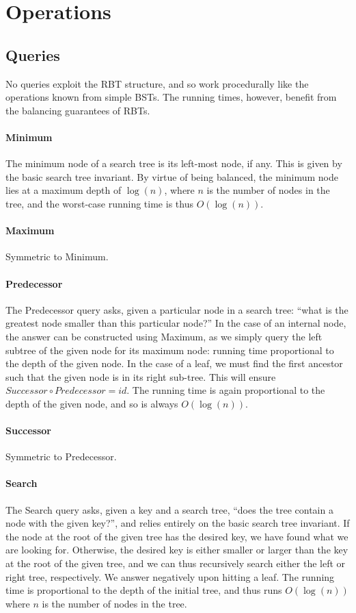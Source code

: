 \documentclass[a4paper, 12pt]{article}
\begin{document}
\section{Operations}

\subsection{Queries}

No queries exploit the RBT structure, and so work procedurally like the
operations known from simple BSTs. The running times, however, benefit
from the balancing guarantees of RBTs.

\paragraph{Minimum} The minimum node of a search tree is its left-most
node, if any. This is given by the basic search tree invariant. By
virtue of being balanced, the minimum node lies at a maximum depth of
$\log(n)$, where $n$ is the number of nodes in the tree, and the
worst-case running time is thus $O(\log(n))$.

\paragraph{Maximum} Symmetric to Minimum.

\paragraph{Predecessor} The Predecessor query asks, given a particular
node in a search tree: ``what is the greatest node smaller than this
particular node?'' In the case of an internal node, the answer can be
constructed using Maximum, as we simply query the left subtree of the
given node for its maximum node: running time proportional to the
depth of the given node. In the case of a leaf, we must find the first
ancestor such that the given node is in its right sub-tree. This will
ensure $Successor \circ Predecessor = id$. The running time is again
proportional to the depth of the given node, and so is always
$O(\log(n))$.

\paragraph{Successor} Symmetric to Predecessor.

\paragraph{Search} The Search query asks, given a key and a search
tree, ``does the tree contain a node with the given key?'', and relies
entirely on the basic search tree invariant. If the node at the root
of the given tree has the desired key, we have found what we are
looking for. Otherwise, the desired key is either smaller or larger
than the key at the root of the given tree, and we can thus
recursively search either the left or right tree, respectively. We
answer negatively upon hitting a leaf. The running time is
proportional to the depth of the initial tree, and thus runs
$O(\log(n))$ where $n$ is the number of nodes in the tree.
\end{document}
